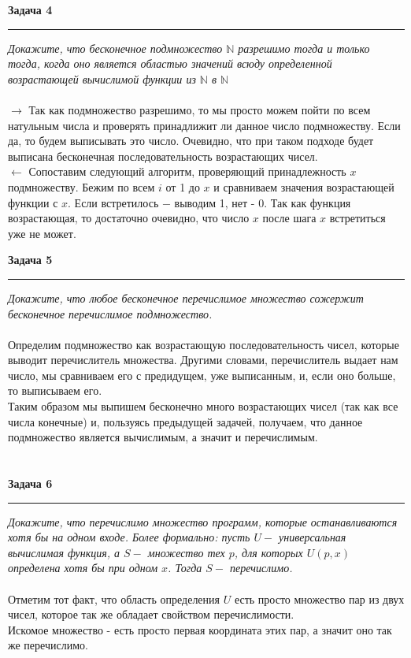 \documentclass[a4paper,11pt]{article}
\begin{document}


\textbf{\large Задача 4}
\medskip\hrule\medskip
\textit{Докажите, что бесконечное подмножество $ \mathbb{N} $  разрешимо тогда и только тогда, когда оно является областью значений всюду определенной возрастающей вычислимой функции из $ \mathbb{N} $ в $ \mathbb{N} $}  \\ \\
$ \rightarrow $ Так как подмножество разрешимо, то мы просто можем пойти по всем натульным числа и проверять принадлижит ли данное число подмножеству. Если да, то будем выписывать это число. Очевидно, что при таком подходе будет выписана бесконечная последовательность возрастающих чисел.  \\[2pt]
$ \leftarrow $  Сопоставим следующий алгоритм, проверяющий принадлежность $ x $ подмножеству. Бежим по всем $ i $ от 1 до $ x $ и сравниваем значения возрастающей функции с $ x $. Если встретилось $ -  $ выводим 1, нет - 0. Так как  функция возрастающая, то достаточно очевидно, что число $  x $ после шага $ x $ встретиться уже не может. 
\newpage




\textbf{\large Задача 5}
\medskip\hrule\medskip
\textit{Докажите, что любое бесконечное перечислимое множество сожержит бесконечное перечислимое подмножество.} \\ \\ 
 
Определим подмножество как возрастающую последовательность чисел, которые выводит перечислитель множества. Другими словами, перечислитель выдает нам число, мы сравниваем его с предидущем, уже выписанным, и, если оно больше, то выписываем его. \\[2pt]
Таким образом мы выпишем бесконечно много возрастающих чисел (так как все числа конечные) и, пользуясь предыдущей задачей, получаем, что данное подмножество является вычислимым, а значит и перечислимым.
\\ \\ \\






\textbf{\large Задача 6}
\medskip\hrule\medskip
\textit{Докажите, что перечислимо множество программ, которые останавливаются хотя бы на одном входе. Более формально: пусть $ U - $ универсальная вычислимая функция, а $ S - $ множество тех $ p $, для которых $ U(p, x) $ определена хотя бы при одном $ x $. Тогда $ S -$ перечислимо.} \\ \\ 
Отметим тот факт, что область определения $ U $ есть  просто множество пар из двух чисел, которое так же обладает свойством перечислимости. \\[2pt]
Искомое множество - есть просто первая координата этих пар, а значит оно так же перечислимо.   
\end{document}

